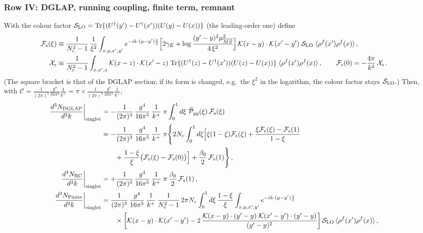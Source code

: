 {\subsubsection*{Row IV: DGLAP, running coupling, finite term, remnant}
\noindent With the colour factor $\mathcal{S}_{\rm LO}={\rm Tr}\{(U^{\dagger}(y')-U^{\dagger}(x'))(U(y)-U(x))\}$ (the leading-order one) define
\begin{align}
\mathcal{F}_{\rm s}(\xi)&\equiv\frac{1}{N_{c}^{2}-1}\,\frac{1}{\xi^{2}}\int_{x,y,x',y'}e^{-ik\cdot(y-y')\frac{1}{\xi}}\Big[2\gamma_{E}+\log\frac{(y'-y)^{2}\mu^{2}_{\overline{MS}}}{4\,\xi^{2}}\Big]\,\mathcal{K}(x-y)\cdot\mathcal{K}(x'-y')\;\mathcal{S}_{\rm LO}\;\langle\rho^{f}(x')\rho^{f}(x)\rangle\,,\notag\\
\mathcal{X}_{\rm s}&\equiv\frac{1}{N_{c}^{2}-1}\int_{x,x',z}\mathcal{K}(x-z)\cdot\mathcal{K}(x'-z)\;{\rm Tr}\{(U^{\dagger}(z)-U^{\dagger}(x'))(U(z)-U(x))\}\;\langle\rho^{f}(x')\rho^{f}(x)\rangle\,,\qquad\mathcal{F}_{\rm s}(0)=-\frac{4\pi}{k^{2}}\,\mathcal{X}_{\rm s}\,.\notag
\end{align}
(The square bracket is that of the DGLAP section; if its form is changed, e.g.\ the $\xi^{2}$ in the logarithm, the colour factor stays $\mathcal{S}_{\rm LO}$.) Then, with $\mathcal{C}=\frac{1}{(2\pi)^{3}}\frac{g^{4}}{16\pi^{4}}\frac{1}{k^{+}}=\pi\times\frac{1}{(2\pi)^{3}}\frac{g^{4}}{16\pi^{5}}\frac{1}{k^{+}}$,
\begin{align}
\frac{d^{3}N_{\rm DGLAP}}{d^{3}k}\bigg|_{\rm singlet}&=-\frac{1}{(2\pi)^{3}}\,\frac{g^{4}}{16\pi^{5}}\,\frac{1}{k^{+}}\;\pi\int_{0}^{1}d\xi\;\widetilde{\mathcal P}_{gg}(\xi)\,\mathcal{F}_{\rm s}(\xi)\notag\\
&=-\frac{1}{(2\pi)^{3}}\,\frac{g^{4}}{16\pi^{5}}\,\frac{1}{k^{+}}\;\pi\Bigg\{2N_{c}\int_{0}^{1}d\xi\Big[\xi(1-\xi)\mathcal{F}_{\rm s}(\xi)+\frac{\xi\mathcal{F}_{\rm s}(\xi)-\mathcal{F}_{\rm s}(1)}{1-\xi}\notag\\&\qquad+\frac{1-\xi}{\xi}\big(\mathcal{F}_{\rm s}(\xi)-\mathcal{F}_{\rm s}(0)\big)\Big]+\frac{\beta_{0}}{2}\,\mathcal{F}_{\rm s}(1)\Bigg\}\,,\label{eq:s-DGLAP}\\
\frac{d^{3}N_{\rm RC}}{d^{3}k}\bigg|_{\rm singlet}&=+\frac{1}{(2\pi)^{3}}\,\frac{g^{4}}{16\pi^{5}}\,\frac{1}{k^{+}}\;\pi\,\frac{\beta_{0}}{2}\,\mathcal{F}_{\rm s}(1)\,,\label{eq:s-RC}\\
\frac{d^{3}N_{\rm Finite}}{d^{3}k}\bigg|_{\rm singlet}&=\frac{1}{(2\pi)^{3}}\,\frac{g^{4}}{16\pi^{5}}\,\frac{1}{k^{+}}\,\frac{1}{N_{c}^{2}-1}\,2\pi N_{c}\int_{0}^{1}d\xi\,\frac{1-\xi}{\xi}\int_{x,y,x',y'}e^{-ik\cdot(y-y')\frac{1}{\xi}}\notag\\&\qquad\times\bigg[\mathcal{K}(x-y)\cdot\mathcal{K}(x'-y')-2\,\frac{\mathcal{K}(x-y)\cdot(y'-y)\;\mathcal{K}(x'-y')\cdot(y'-y)}{(y'-y)^{2}}\bigg]\,\mathcal{S}_{\rm LO}\,\langle\rho^{f}(x')\rho^{f}(x)\rangle\,,\label{eq:s-fin}\\

\end{align}}
